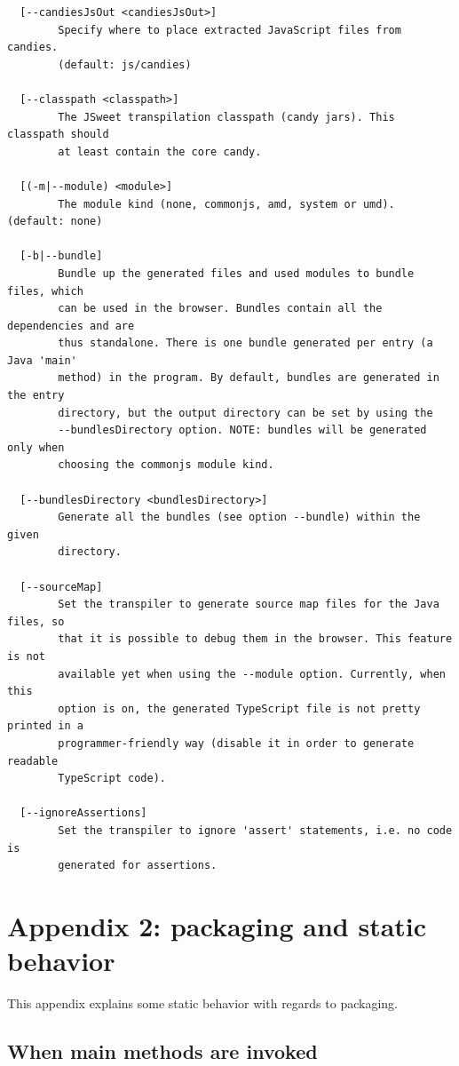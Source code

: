 \documentclass[a4paper]{report}
\begin{document}
\begin{small}
\begin{verbatim}
  [--candiesJsOut <candiesJsOut>]
        Specify where to place extracted JavaScript files from candies.
        (default: js/candies)

  [--classpath <classpath>]
        The JSweet transpilation classpath (candy jars). This classpath should
        at least contain the core candy.

  [(-m|--module) <module>]
        The module kind (none, commonjs, amd, system or umd). (default: none)

  [-b|--bundle]
        Bundle up the generated files and used modules to bundle files, which
        can be used in the browser. Bundles contain all the dependencies and are
        thus standalone. There is one bundle generated per entry (a Java 'main'
        method) in the program. By default, bundles are generated in the entry
        directory, but the output directory can be set by using the
        --bundlesDirectory option. NOTE: bundles will be generated only when
        choosing the commonjs module kind.

  [--bundlesDirectory <bundlesDirectory>]
        Generate all the bundles (see option --bundle) within the given
        directory.

  [--sourceMap]
        Set the transpiler to generate source map files for the Java files, so
        that it is possible to debug them in the browser. This feature is not
        available yet when using the --module option. Currently, when this
        option is on, the generated TypeScript file is not pretty printed in a
        programmer-friendly way (disable it in order to generate readable
        TypeScript code).

  [--ignoreAssertions]
        Set the transpiler to ignore 'assert' statements, i.e. no code is
        generated for assertions.
\end{verbatim}
\end{small}
       
\chapter*{Appendix 2: packaging and static behavior}
\label{static_behavior}

This appendix explains some static behavior with regards to packaging.

\section*{When main methods are invoked}
\end{document}

